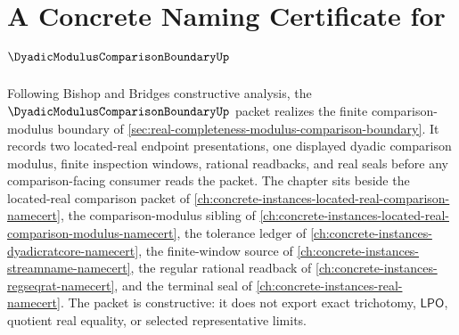 \chapter{A Concrete Naming Certificate for $\DyadicModulusComparisonBoundaryUp$}
\label{ch:concrete-instances-dyadic-modulus-comparison-boundary-namecert}

Following Bishop and Bridges constructive analysis, the $\DyadicModulusComparisonBoundaryUp$ packet realizes the finite comparison-modulus boundary of \autoref{sec:real-completeness-modulus-comparison-boundary}. It records two located-real endpoint presentations, one displayed dyadic comparison modulus, finite inspection windows, rational readbacks, and real seals before any comparison-facing consumer reads the packet. The chapter sits beside the located-real comparison packet of \autoref{ch:concrete-instances-located-real-comparison-namecert}, the comparison-modulus sibling of \autoref{ch:concrete-instances-located-real-comparison-modulus-namecert}, the tolerance ledger of \autoref{ch:concrete-instances-dyadicratcore-namecert}, the finite-window source of \autoref{ch:concrete-instances-streamname-namecert}, the regular rational readback of \autoref{ch:concrete-instances-regseqrat-namecert}, and the terminal seal of \autoref{ch:concrete-instances-real-namecert}. The packet is constructive: it does not export exact trichotomy, $\mathsf{LPO}$, quotient real equality, or selected representative limits.

